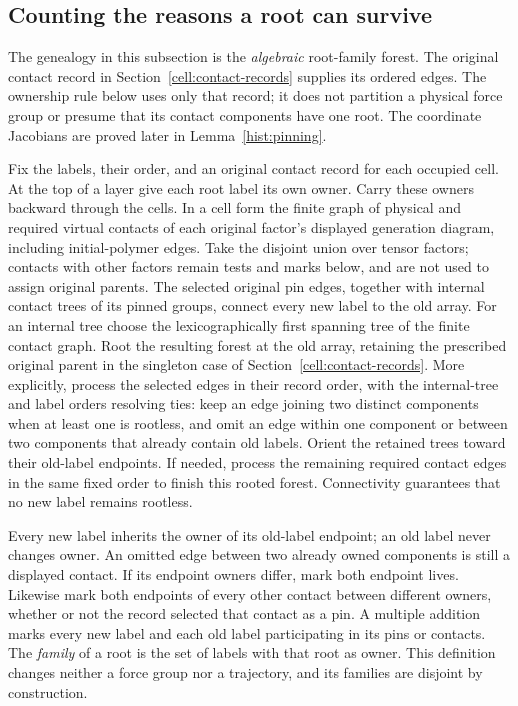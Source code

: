 \subsection{Counting the reasons a root can survive}

The genealogy in this subsection is the \emph{algebraic} root-family
forest. The original contact record in
Section~\ref{cell:contact-records} supplies its ordered edges. The
ownership rule below uses only that record; it does not partition a
physical force group or presume that its contact components have one
root. The coordinate Jacobians are proved later in
Lemma~\ref{hist:pinning}.

\begin{definition}\label{cent:ownership}
Fix the labels, their order, and an original contact record for each occupied
cell. At the top of a layer give each root label its own owner. Carry
these owners backward through the cells. In a cell form the finite
graph of physical and required virtual contacts of each original
factor's displayed generation diagram, including initial-polymer
edges. Take the disjoint union over tensor factors; contacts with
other factors remain tests and marks below, and are not used to
assign original parents. The selected
original pin edges, together with internal contact trees of its
pinned groups, connect every new label to the old array. For an
internal tree choose the lexicographically first spanning tree of
the finite contact graph. Root the resulting forest at the old
array, retaining the prescribed original parent in the singleton case
of Section~\ref{cell:contact-records}. More explicitly, process the selected edges in
their record order, with the internal-tree and label orders resolving
ties: keep an edge joining two distinct components when at least one
is rootless, and omit an edge within one component or between two
components that already contain old
labels. Orient the retained trees toward their old-label endpoints.
If needed, process the remaining required contact edges in the same
fixed order to finish this rooted forest. Connectivity guarantees
that no new label remains rootless.

Every new label inherits the owner of its old-label endpoint; an old
label never changes owner. An omitted edge between two already
owned components is still a displayed contact. If its endpoint
owners differ, mark both endpoint lives. Likewise mark both
endpoints of every other contact between different owners, whether
or not the record selected that contact as a pin. A multiple addition
marks every new label and each old label participating in its pins
or contacts. The \emph{family} of a root is the set of labels with
that root as owner. This definition changes neither a force group
nor a trajectory, and its families are disjoint by construction.
\end{definition}

